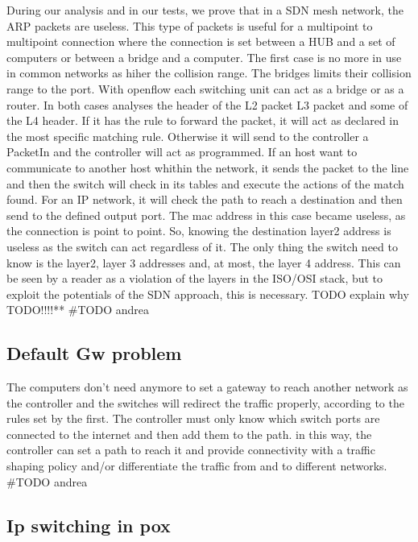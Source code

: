 \documentclass[conference,10pt]{IEEEtran}
\begin{document}
  During our analysis and in our tests, we prove that in a SDN mesh network, the ARP packets are useless.
  This type of packets is useful for a multipoint to multipoint connection where the connection is set between a
  HUB and a set of computers or between a bridge and a computer. The first case is no more in use in common networks as
  hiher the collision range. The bridges limits their collision range to the port. With openflow each switching unit can
  act as a bridge or as a router. In both cases analyses the header of the L2 packet L3 packet and some of the L4 header.
  If it has the rule to forward the packet, it will act as declared in the most specific matching rule. Otherwise it will
  send to the controller a PacketIn and the controller will act as programmed. If an host want to communicate to another host whithin
  the network, it sends the packet to the line and then the switch will check in its tables and execute the actions of the match found.
  For an IP network, it will check the path to reach a destination and then send to the defined output port. The mac address in this case
  became useless, as the connection is point to point. So, knowing the destination layer2 address is useless as the switch can act
  regardless of it. The only thing the switch need to know is the layer2, layer 3 addresses and, at most, the layer 4 address.
  This can be seen by a reader as a violation of the layers in the ISO/OSI stack, but to exploit the potentials of the SDN approach,
  this is necessary. TODO explain why TODO!!!!**
  \#TODO andrea

  \subsection{Default Gw problem}

  The computers don't need anymore to set a gateway to reach another network as the controller and the switches will redirect the traffic
  properly, according to the rules set by the first. The controller must only know which switch ports are connected to the
  internet and then add them to the path. in this way, the controller can set a path to reach it and provide connectivity with
  a traffic shaping policy and/or differentiate the traffic from and to different networks.
  \#TODO andrea

  \subsection{Ip switching in pox}
\end{document}
